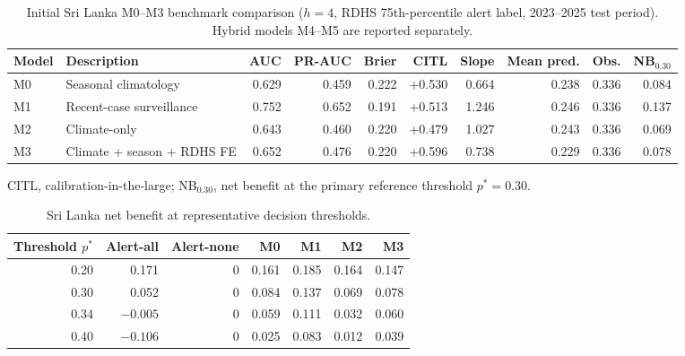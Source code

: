 \documentclass[11pt,a4paper]{article}
\begin{document}
\begin{table}[htbp]
\centering
\caption{Initial Sri Lanka M0--M3 benchmark comparison ($h=4$, RDHS 75th-percentile alert label, 2023--2025 test period). Hybrid models M4--M5 are reported separately.}
\label{tab:slprimary}
\begin{threeparttable}\footnotesize
\setlength{\tabcolsep}{3.6pt}
\begin{tabular}{llrrrrrrrr}
\toprule
Model & Description & AUC & PR-AUC & Brier & CITL & Slope & Mean pred. & Obs. & NB$_{0.30}$ \\
\midrule
M0 & Seasonal climatology & 0.629 & 0.459 & 0.222 & +0.530 & 0.664 & 0.238 & 0.336 & 0.084 \\
M1 & Recent-case surveillance & 0.752 & 0.652 & 0.191 & +0.513 & 1.246 & 0.246 & 0.336 & 0.137 \\
M2 & Climate-only & 0.643 & 0.460 & 0.220 & +0.479 & 1.027 & 0.243 & 0.336 & 0.069 \\
M3 & Climate + season + RDHS FE & 0.652 & 0.476 & 0.220 & +0.596 & 0.738 & 0.229 & 0.336 & 0.078 \\
\bottomrule
\end{tabular}
\begin{tablenotes}\footnotesize
\item CITL, calibration-in-the-large; NB$_{0.30}$, net benefit at the primary reference threshold $p^*=0.30$.
\end{tablenotes}
\end{threeparttable}
\end{table}

\begin{table}[htbp]
\centering
\caption{Sri Lanka net benefit at representative decision thresholds.}
\label{tab:slthresh}
\small
\begin{tabular}{rrrrrrr}
\toprule
Threshold $p^*$ & Alert-all & Alert-none & M0 & M1 & M2 & M3 \\
\midrule
0.20 & 0.171 & 0 & 0.161 & 0.185 & 0.164 & 0.147 \\
0.30 & 0.052 & 0 & 0.084 & 0.137 & 0.069 & 0.078 \\
0.34 & $-0.005$ & 0 & 0.059 & 0.111 & 0.032 & 0.060 \\
0.40 & $-0.106$ & 0 & 0.025 & 0.083 & 0.012 & 0.039 \\
\bottomrule
\end{tabular}
\end{table}
\end{document}
